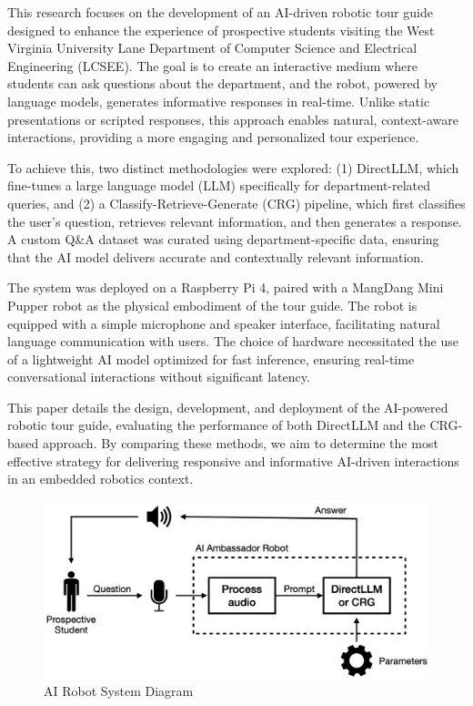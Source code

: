 \documentclass[conference]{IEEEtran}
\begin{document}
This research focuses on the development of an AI-driven robotic tour guide designed to enhance the experience of prospective students visiting the West Virginia University Lane Department of Computer Science and Electrical Engineering (LCSEE). 
The goal is to create an interactive medium where students can ask questions about the department, and the robot, powered by language models, generates informative responses in real-time. 
Unlike static presentations or scripted responses, this approach enables natural, context-aware interactions, providing a more engaging and personalized tour experience.

To achieve this, two distinct methodologies were explored: 
(1) DirectLLM, which fine-tunes a large language model (LLM) specifically for department-related queries, and 
(2) a Classify-Retrieve-Generate (CRG) pipeline, which first classifies the user's question, retrieves relevant information, and then generates a response. 
A custom Q\&A dataset was curated using department-specific data, ensuring that the AI model delivers accurate and contextually relevant information.

The system was deployed on a Raspberry Pi 4, paired with a MangDang Mini Pupper \cite{b1} robot as the physical embodiment of the tour guide. 
The robot is equipped with a simple microphone and speaker interface, facilitating natural language communication with users. 
The choice of hardware necessitated the use of a lightweight AI model optimized for fast inference, ensuring real-time conversational interactions without significant latency.

This paper details the design, development, and deployment of the AI-powered robotic tour guide, evaluating the performance of both DirectLLM and the CRG-based approach. 
By comparing these methods, we aim to determine the most effective strategy for delivering responsive and informative AI-driven interactions in an embedded robotics context.

\begin{figure}[t]
    \centering
    \includegraphics[width=0.70\linewidth]{assets/system_diagram.png}
    \caption{AI Robot System Diagram}
    \label{fig:system}
\end{figure}
\end{document}
